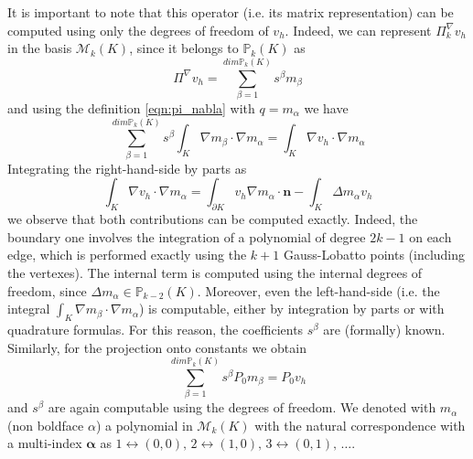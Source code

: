 \documentclass[10pt]{article}
\begin{document}
It is important to note that this operator (i.e. its matrix representation) can be computed using only the degrees of freedom of $v_h$. Indeed, we can represent $\Pi_k^\nabla v_h$ in the basis $\mathcal{M}_k(K)$, since it belongs to $\mathbb{P}_k(K)$ as $$\Pi^\nabla v_h= \sum_{\beta=1}^{dim \mathbb{P}_k(K)} s^\beta m_\beta$$and using the definition \eqref{eqn:pi_nabla} with $q=m_\alpha$ we have 
$$\sum_{\beta=1}^{dim \mathbb{P}_k(K)} s^\beta \int_{K}\nabla m_\beta \cdot \nabla m_\alpha = \int_K \nabla v_h \cdot \nabla m_\alpha $$
Integrating the right-hand-side by parts as
$$ \int_K \nabla v_h \cdot \nabla m_\alpha = \int_{\partial K} v_h \nabla m_\alpha \cdot \mathbf{n} - \int_K \Delta m_\alpha v_h $$
we observe that both contributions can be computed exactly. Indeed, the boundary one involves the integration of a polynomial of degree $2k-1$ on each edge, which is performed exactly using the $k+1$ Gauss-Lobatto points (including the vertexes). The internal term is computed using the internal degrees of freedom, since $\Delta m_\alpha \in \mathbb{P}_{k-2}(K)$.
Moreover, even the left-hand-side (i.e. the integral $\int_{K}\nabla m_\beta \cdot \nabla m_\alpha$) is computable, either by integration by parts or with quadrature formulas. For this reason, the coefficients $s^\beta$ are (formally) known.
Similarly, for the projection onto constants we obtain
$$\sum_{\beta=1}^{dim \mathbb{P}_k(K)} s^\beta P_0 m_\beta = P_0 v_h $$
and $s^\beta$ are again computable using the degrees of freedom. We denoted with $m_\alpha$ (non boldface $\alpha$) a polynomial in $\mathcal{M}_k(K)$ with the natural correspondence with a multi-index $\mathbf{\alpha}$ as $1 \leftrightarrow (0,0), \, 2 \leftrightarrow (1,0), \, 3 \leftrightarrow (0,1), \, \dots$.
\end{document}

